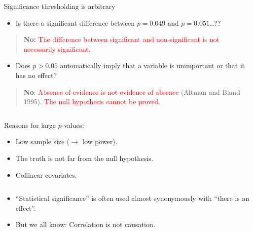 \documentclass[
  10pt,
  ignorenonframetext,
]{beamer}
\providecommand{\tightlist}{%
  \setlength{\itemsep}{0pt}\setlength{\parskip}{0pt}}
\begin{document}
\begin{frame}
\begin{block}{Significance thresholding is arbitrary}
\protect\hypertarget{significance-thresholding-is-arbitrary}{}
\(~\)

\begin{itemize}
\tightlist
\item
  Is there a significant difference between \(p=0.049\) and
  \(p=0.051\)\ldots??
\end{itemize}

\pause
\vspace{2mm}

\begin{quote}
\textbf{No: }
\textcolor{red}{The difference between significant and non-significant is not necessarily significant.}
\end{quote}

\vspace{2mm}

\pause

\begin{itemize}
\tightlist
\item
  Does \(p>0.05\) automatically imply that a variable is unimportant or
  that it has no effect?
\end{itemize}

\pause
\vspace{2mm}

\begin{quote}
\textbf{No}:
\textcolor{red}{Absence of evidence is not evidence of absence} (Altman
and Bland 1995). \textcolor{red}{The null hypothesis cannot be proved.}
\end{quote}

\pause

\(~\)

Reasons for large \(p\)-values:

\begin{itemize}
\tightlist
\item
  Low sample size (\(\rightarrow\) low power).
\item
  The truth is not far from the null hypothesis.
\item
  Collinear covariates.
\end{itemize}
\end{block}
\end{frame}

\begin{frame}
\(~\)

\begin{itemize}
\tightlist
\item
  ``Statistical significance'' is often used almost synonymously with
  ``there is an effect''.
\end{itemize}

\vspace{2mm}

\begin{itemize}
\tightlist
\item
  But we all know: Correlation is not causation.
\end{itemize}
\end{frame}
\end{document}
